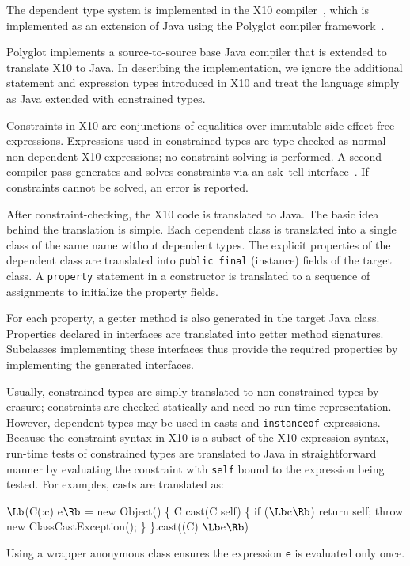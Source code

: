 %

The dependent type system is implemented in the X10
compiler~\cite{X10}, which is implemented as an extension of
Java using the Polyglot compiler framework~\cite{ncm03}.

Polyglot implements a source-to-source base Java compiler 
that is extended to translate X10 to Java.  In describing the
implementation, we ignore the additional statement and expression types
introduced in X10 and treat the language simply as Java
extended with constrained types.

Constraints in X10 are conjunctions of equalities over immutable
side-effect-free expressions.  Expressions used in constrained
types are type-checked as normal non-dependent X10 expressions;
no constraint solving is performed.
A second compiler pass generates and solves constraints via an
ask--tell interface~\cite{my-thesis-book}.
If constraints cannot be solved, an error is reported.

After constraint-checking, the X10 code is translated to Java.
The basic idea behind the translation is simple. Each dependent class
is translated into a single class of the same name without dependent
types. The explicit properties of the dependent class are translated
into {\tt public final} (instance) fields of the target class.
A {\tt property} statement in a constructor is translated to a
sequence of assignments to initialize the property fields.

For each property, a getter method is also generated in the
target Java class.
Properties declared in interfaces are translated into getter
method signatures.  Subclasses implementing these interfaces
thus provide the required properties by implementing the
generated interfaces.

Usually, constrained types are simply translated to
non-constrained types by erasure; constraints are checked
statically and need no run-time representation.
However, dependent types may be used in casts
and {\tt instanceof} expressions.  Because the constraint syntax
in X10 is a subset of the X10 expression syntax, run-time tests
of constrained types are translated to Java
in straightforward manner by evaluating the constraint with
{\tt self} bound to the expression being tested.
For examples, casts are translated as:
\begin{code}
  $\Lb$(C(:c) e$\Rb$ = 
    new Object() \{
      C cast(C self) \{
        if ($\Lb$c$\Rb$)
          return self;
        throw new ClassCastException();
      \}
    \}.cast((C) $\Lb$e$\Rb$)
\end{code}
\noindent Using a wrapper anonymous class ensures the expression
{\tt e} is evaluated only once.



